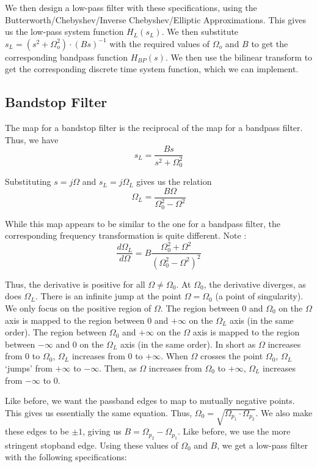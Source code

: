\documentclass{article}
\theoremstyle{definition}
\begin{document}
We then design a low-pass filter with these specifications, using the Butterworth/Chebyshev/Inverse Chebyshev/Elliptic Approximations. This gives us the low-pass system function $H_L(s_L)$. We then substitute $s_L = (s^2 + \Omega_o^2) \cdot (Bs)^{-1}$ with the required values of $\Omega_o$ and $B$ to get the corresponding bandpass function $H_{BP}(s)$. We then use the bilinear transform to get the corresponding discrete time system function, which we can implement.

\subsection{Bandstop Filter}

The map for a bandstop filter is the reciprocal of the map for a bandpass filter. Thus, we have 
\[
    s_L = \frac{Bs}{s^2 + \Omega_0^2}
\]

Substituting $s = j\Omega$ and $s_L = j \Omega_L$ gives us the relation
\[
    \Omega_L = \frac{B\Omega}{\Omega_0^2 - \Omega^2}
\]

While this map appears to be similar to the one for a bandpass filter, the corresponding frequency transformation is quite different. Note :
\[
    \frac{d\Omega_L}{d\Omega} = B \frac{\Omega_0^2 + \Omega^2}{(\Omega_0^2 - \Omega^2)^2}
\]

Thus, the derivative is positive for all $\Omega \neq \Omega_0$. At $\Omega_0$, the derivative diverges, as does $\Omega_L$. There is an infinite jump at the point $\Omega = \Omega_0$ (a point of singularity). We only focus on the positive region of $\Omega$. The region between $0$ and $\Omega_0$ on the $\Omega$ axis is mapped to the region between $0$ and $+\infty$ on the $\Omega_L$ axis (in the same order). The region between $\Omega_0$ and $+\infty$ on the $\Omega$ axis is mapped to the region between $-\infty$ and $0$ on the $\Omega_L$ axis (in the same order). In short as $\Omega$ increases from $0$ to $\Omega_0$, $\Omega_L$ increases from $0$ to $+\infty$. When $\Omega$ crosses the point $\Omega_0$, $\Omega_L$ `jumps' from $+\infty$ to $-\infty$. Then, as $\Omega$ increases from $\Omega_0$ to $+\infty$, $\Omega_L$ increases from $-\infty$ to $0$. \medskip

Like before, we want the passband edges to map to mutually negative points. This gives us essentially the same equation. Thus, $\Omega_0 = \sqrt{\Omega_{p_1} \cdot \Omega_{p_2}}$. We also make these edges to be $\pm 1$, giving us $B = \Omega_{p_2} - \Omega_{p_1}$. Like before, we use the more stringent stopband edge. Using these values of $\Omega_0$ and $B$, we get a low-pass filter with the following specifications:
\end{document}
